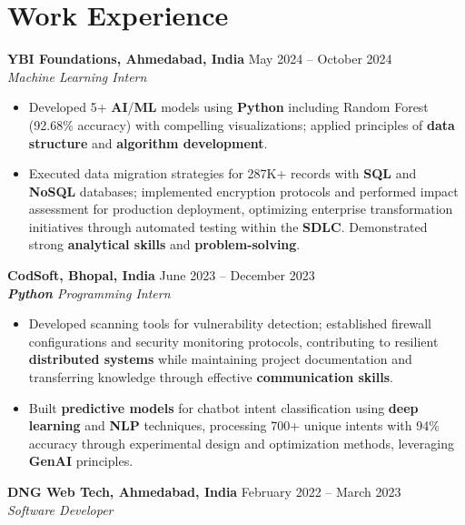 \documentclass[a4paper,10pt]{article}
\begin{document}
\section*{Work Experience}
\textbf{YBI Foundations, Ahmedabad, India} \hfill May 2024 -- October 2024\\
\textit{Machine Learning Intern} \\
\begin{itemize}[leftmargin=*, itemsep=0pt, parsep=1pt]
\vspace{-6mm}
\item Developed 5+ \textbf{AI}/\textbf{ML} models using \textbf{Python} including Random Forest (92.68\% accuracy) with compelling visualizations; applied principles of \textbf{data structure} and \textbf{algorithm development}.
\item Executed data migration strategies for 287K+ records with \textbf{SQL} and \textbf{NoSQL} databases; implemented encryption protocols and performed impact assessment for production deployment, optimizing enterprise transformation initiatives through automated testing within the \textbf{SDLC}. Demonstrated strong \textbf{analytical skills} and \textbf{problem-solving}.
\end{itemize}
\textbf{CodSoft, Bhopal, India} \hfill June 2023 -- December 2023\\
\textit{\textbf{Python} Programming Intern} \\
\begin{itemize}[leftmargin=*, itemsep=0pt, parsep=1pt]
\vspace{-6mm}
\item Developed scanning tools for vulnerability detection; established firewall configurations and security monitoring protocols, contributing to resilient \textbf{distributed systems} while maintaining project documentation and transferring knowledge through effective \textbf{communication skills}.
\item Built \textbf{predictive models} for chatbot intent classification using \textbf{deep learning} and \textbf{NLP} techniques, processing 700+ unique intents with 94\% accuracy through experimental design and optimization methods, leveraging \textbf{GenAI} principles.
\vspace{-1mm}
\end{itemize}

\textbf{DNG Web Tech, Ahmedabad, India} \hfill February 2022 -- March 2023 \\
\textit{Software Developer} \\
\end{document}
